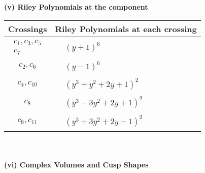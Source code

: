 \documentclass[1p]{elsarticle_modified}
\theoremstyle{definition}
\begin{document}
\newpage\renewcommand{\arraystretch}{1}
\flushleft \textbf{(v) Riley Polynomials at the component}\newline \\
\begin{tabular}{m{50pt}|m{274pt}}
Crossings & \hspace{64pt}Riley Polynomials at each crossing \\
\hline $$\begin{aligned}c_{1},c_{3},c_{5}\\c_{7}\end{aligned}$$&$\begin{aligned}
&(y+1)^6
\end{aligned}$\\
\hline $$\begin{aligned}c_{2},c_{6}\end{aligned}$$&$\begin{aligned}
&(y-1)^6
\end{aligned}$\\
\hline $$\begin{aligned}c_{4},c_{10}\end{aligned}$$&$\begin{aligned}
&(y^3+y^2+2 y+1)^2
\end{aligned}$\\
\hline $$\begin{aligned}c_{8}\end{aligned}$$&$\begin{aligned}
&(y^3-3 y^2+2 y+1)^2
\end{aligned}$\\
\hline $$\begin{aligned}c_{9},c_{11}\end{aligned}$$&$\begin{aligned}
&(y^3+3 y^2+2 y-1)^2
\end{aligned}$\\
\hline
\end{tabular}\\~\\
\newpage\flushleft \textbf{(vi) Complex Volumes and Cusp Shapes}
\end{document}
